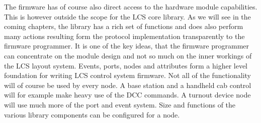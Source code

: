 \begin{center}
\end{center}
\FloatBarrier

The firmware has of course also direct access to the hardware module capabilities. This is however outside the scope for the LCS core library. As we will see in the coming chapters, the library has a rich set of functions and does also perform many actions resulting form the protocol implementation transparently to the firmware programmer. It is one of the key ideas, that the firmware programmer can concentrate on the module design and not so much on the inner workings of the LCS layout system. Events, ports, nodes and attributes form a higher level foundation for writing LCS control system firmware. Not all of the functionality will of course be used by every node. A base station and a handheld cab control will for example make heavy use of the DCC commands. A turnout device node will use much more of the port and event system. Size and functions of the various library components can be configured for a node.

